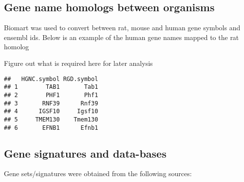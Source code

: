 \documentclass[
]{book}
\begin{document}
\hypertarget{gene-name-homologs-between-organisms}{%
\subsection{Gene name homologs between organisms}\label{gene-name-homologs-between-organisms}}

Biomart was used to convert between rat, mouse and human gene symbols and ensembl ids. Below is an example of the human gene names mapped to the rat homolog

{
Figure out what is required here for later analysis
}

\begin{verbatim}
##   HGNC.symbol RGD.symbol
## 1        TAB1       Tab1
## 2        PHF1       Phf1
## 3       RNF39      Rnf39
## 4      IGSF10     Igsf10
## 5     TMEM130    Tmem130
## 6       EFNB1      Efnb1
\end{verbatim}

\hypertarget{gene-signatures-and-data-bases}{%
\subsection{Gene signatures and data-bases}\label{gene-signatures-and-data-bases}}

Gene sets/signatures were obtained from the following sources:
\end{document}
